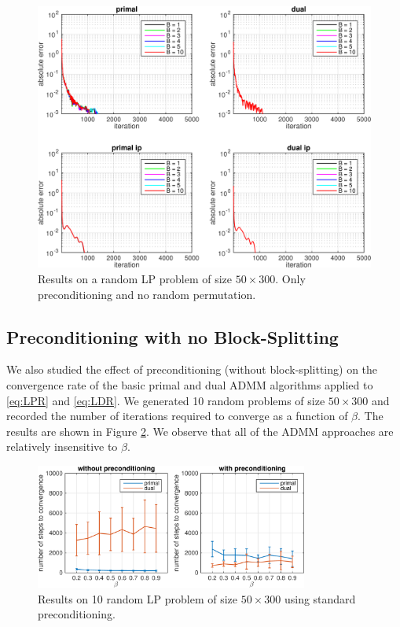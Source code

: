 \documentclass{article}
\begin{document}
\begin{figure}[h]
	\includegraphics[width=\textwidth]{../figures/precond_norndperm.png}
	\caption{Results on a random LP problem of size $50 \times 300$. Only preconditioning and no random permutation.}
	\label{fig:p_nor}
\end{figure}

\subsection*{Preconditioning with no Block-Splitting}

We also studied the effect of preconditioning (without block-splitting) on the convergence rate of the basic primal and dual ADMM algorithms applied to \eqref{eq:LPR} and \eqref{eq:LDR}. We generated 10 random problems of size $50 \times 300$ and recorded the number of iterations required to converge as a function of $\beta$. The results  are shown in Figure \ref{fig:base_p_d}. We observe that all of the ADMM approaches are relatively insensitive to $\beta$.

\begin{figure}[ht]
	\centering
	\includegraphics[width=0.8\textwidth]{../figures/primal_dual_preconditioning.png}
	\caption{Results on 10 random LP problem of size $50 \times 300$ using standard preconditioning. }
	\label{fig:base_p_d}
\end{figure}
\end{document}
